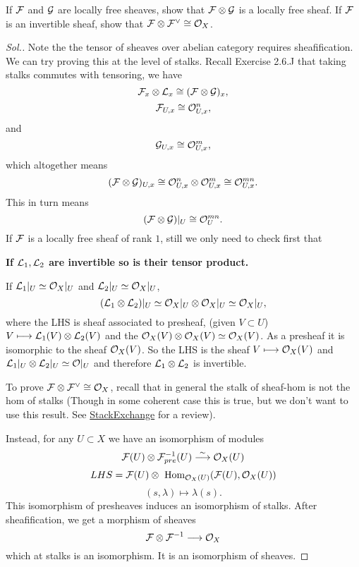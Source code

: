 \documentclass[11pt]{book} %
\begin{document}
\begin{exr}
If ${\cal F}$ and ${\cal G}$ are locally free sheaves, show that ${\cal F}\otimes {\cal G}$ is a locally free sheaf.  If ${\cal F}$ is an invertible sheaf, show that ${\cal F}\otimes {\cal F}^\vee\cong {\cal O}_X$.
\end{exr}
\begin{proof}[Sol.]
Note the the tensor of sheaves over abelian category requires sheafification. We can try proving this at the level of stalks. Recall Exercise 2.6.J that taking stalks commutes with tensoring, we have
$$
{\cal F}_{x}\otimes{\cal L}_{x}\cong ({\cal F}\otimes {\cal G})_{x},
$$
$$
{\cal F}_{U,x}\cong{\cal O}_{U,x}^n,
$$
and
$$
{\cal G}_{U,x}\cong {\cal O}_{U,x}^m,
$$
which altogether means 
$$
({\cal F}\otimes {\cal G})_{U,x}\cong {\cal O}_{U,x}^n\otimes {\cal O}_{U,x}^m\cong {\cal O}_{U,x}^{mn}.
$$
This in turn means
$$
({\cal F}\otimes {\cal G})|_U\cong {\cal O}_{U}^{mn} .
$$
If ${\cal F}$ is a locally free sheaf of rank $1$, still we only need to check first that

\textbf{If ${\cal L}_1,{\cal L}_2$ are invertible so is their tensor product.} 

If ${\cal L}_1|_U\simeq {\cal O}_X|_U$ and ${\cal L}_2|_U\simeq {\cal O}_X|_U$,  
$$
({\cal L}_1\otimes{\cal L}_2)|_U\simeq {\cal O}_X|_U\otimes{\cal O}_X|_U\simeq {\cal O}_X|_U,
$$ where the LHS is sheaf associated to presheaf, (given $V\subset U$) $V\longmapsto{\cal L}_1(V)\otimes{\cal L}_2(V)$ and the ${\cal O}_X(V)\otimes {\cal O}_X(V)\simeq {\cal O}_X(V)$. As a presheaf it is isomorphic to the sheaf ${\cal O}_{X}(V)$. So the LHS is the sheaf $V\longmapsto {\cal O}_X(V)$ and ${\cal L}_1|_U\otimes {\cal L}_2|_U\simeq {\cal O}|_U$ and therefore ${\cal L}_1\otimes {\cal L}_2$ is invertible.

To prove ${\cal F}\otimes {\cal F}^\vee\cong {\cal O}_X$, recall that in general the stalk of sheaf-hom is not the hom of stalks (Though in some coherent case this is true, but we don't want to use this result. See \href{https://mathoverflow.net/questions/642/stalks-of-sheaf-hom}{StackExchange} for a review).

Instead,
for any $U\subset X$ we have an isomorphism of modules
$$
{\cal F}(U)\otimes{\cal F}^{-1}_{pre}(U)\overset{\sim}{\longrightarrow}{\cal O}_X(U)
$$
$$
LHS={\cal F}(U)\otimes\text{ Hom}_{{\cal O}_X(U)}({\cal F}(U),{\cal O}_X(U))
$$
$$
(s,\lambda)\longmapsto \lambda(s).
$$
This isomorphism of presheaves induces an isomorphism of stalks.
After sheafification, we get a morphism of sheaves
$$
{\cal F}\otimes{\cal F}^{-1}\longrightarrow {\cal O}_X
$$
which at stalks is an isomorphism. It is an isomorphism of sheaves.
\end{proof}
\end{document}

